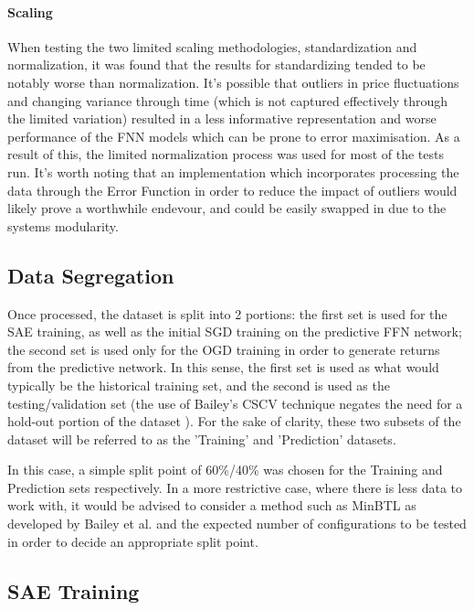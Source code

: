 \documentclass[a4paper,latin]{paper}
\begin{document}
\paragraph {Scaling} When testing the two limited scaling methodologies, standardization and normalization, it was found that the results for standardizing tended to be notably worse than normalization. It's possible that outliers in price fluctuations and changing variance through time (which is not captured effectively through the limited variation) resulted in a less informative representation and worse performance of the FNN models which can be prone to error maximisation. As a result of this, the limited normalization process was used for most of the tests run. It's worth noting that an implementation which incorporates processing the data through the Error Function in order to reduce the impact of outliers would likely prove a worthwhile endevour, and could be easily swapped in due to the systems modularity.\newline


\subsection{Data Segregation}\label{proc_dataseg}

Once processed, the dataset is split into 2 portions: the first set is used for the SAE training, as well as the initial SGD training on the predictive FFN network; the second set is used only for the OGD training in order to generate returns from the predictive network. In this sense, the first set is used as what would typically be the historical training set, and the second is used as the testing/validation set (the use of Bailey's CSCV technique negates the need for a hold-out portion of the dataset \cite{BailyPBO}). For the sake of clarity, these two subsets of the dataset will be referred to as the 'Training' and 'Prediction' datasets. \newline

In this case, a simple split point of 60\%/40\% was chosen for the Training and Prediction sets respectively. In a more restrictive case, where there is less data to work with, it would be advised to consider a method such as MinBTL as developed by Bailey et al. \cite{BaileyBTL} and the expected number of configurations to be tested in order to decide an appropriate split point.

\subsection{SAE Training}\label{proc_sae}
\end{document}

